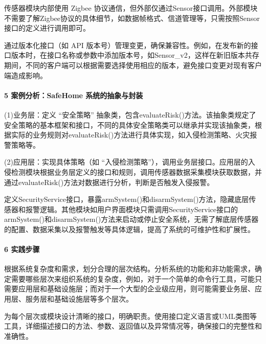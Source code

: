 传感器模块内部使用 Zigbee 协议通信，但外部仅通过Sensor接口调用。外部模块不需要了解Zigbee协议的具体细节，如数据帧格式、信道管理等，只需按照Sensor接口的定义进行调用即可。


通过版本化接口（如 API 版本号）管理变更，确保兼容性。例如，在发布新的接口版本时，在接口名称或参数中添加版本号，如Sensor\_v2，这样在新旧版本共存期间，不同的客户端可以根据需要选择使用相应的版本，避免接口变更对现有客户端造成影响。

\hypertarget{ux6848ux4f8bux5206ux6790safehome-ux7cfbux7edfux7684ux62bdux8c61ux4e0eux5c01ux88c5}{%
\paragraph{5 案例分析：SafeHome 系统的抽象与封装}\label{ux6848ux4f8bux5206ux6790safehome-ux7cfbux7edfux7684ux62bdux8c61ux4e0eux5c01ux88c5}}


(1)业务层：定义 ``安全策略'' 抽象类，包含evaluateRisk()方法。该抽象类规定了安全策略的基本框架和接口，不同的具体安全策略类可以继承并实现该抽象类，根据实际的业务规则对evaluateRisk()方法进行具体实现，如入侵检测策略、火灾报警策略等。

(2)应用层：实现具体策略（如 ``入侵检测策略''），调用业务层接口。应用层的入侵检测模块根据业务层定义的接口和规则，调用传感器数据采集模块获取数据，并通过evaluateRisk()方法对数据进行分析，判断是否触发入侵报警。


定义SecurityService接口，暴露armSystem()和disarmSystem()方法，隐藏底层传感器和报警逻辑。其他模块如用户界面模块只需调用SecurityService接口的armSystem()和disarmSystem()方法来启动或停止安全系统，无需了解底层传感器的配置、数据采集以及报警触发等具体逻辑，提高了系统的可维护性和扩展性。

\hypertarget{ux5b9eux8df5ux6b65ux9aa4-1}{%
\paragraph{6 实践步骤}\label{ux5b9eux8df5ux6b65ux9aa4-1}}

根据系统复杂度和需求，划分合理的层次结构。分析系统的功能和非功能需求，确定需要哪些层次来组织系统的复杂度，例如，对于一个简单的命令行工具，可能只需要应用层和基础设施层；而对于一个大型的企业级应用，则可能需要业务层、应用层、服务层和基础设施层等多个层次。

为每个层次或模块设计清晰的接口，明确职责。使用接口定义语言或UML类图等工具，详细描述接口的方法、参数、返回值以及异常情况等，确保接口的完整性和准确性。

